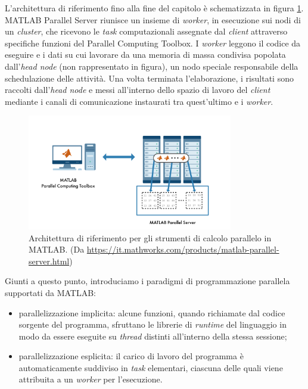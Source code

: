 L'architettura di riferimento fino alla fine del capitolo \`e schematizzata in figura \ref{fig:ArchitetturaRiferimento}.\newline
MATLAB Parallel Server riunisce un insieme di \textit{worker}, in esecuzione sui nodi di un \textit{cluster}, che ricevono le 
\textit{task} computazionali assegnate dal \textit{client} attraverso specifiche funzioni del Parallel Computing Toolbox. \newline
I \textit{worker} leggono il codice da eseguire e i dati su cui lavorare da una memoria di massa condivisa popolata dall'\textit{head node} 
(non rappresentato in figura), un nodo speciale responsabile della schedulazione delle attivit\`a.\newline
Una volta terminata l'elaborazione, i risultati sono raccolti dall'\textit{head node} e messi all'interno dello spazio di lavoro del \textit{client} 
mediante i canali di comunicazione instaurati tra quest'ultimo e i \textit{worker}.

\begin{figure}[htbp]
    \centering
    \includegraphics[width=0.8\textwidth]{../Immagini/Capitolo 2/ReferenceArchitecture.png}
    \caption{Architettura di riferimento per gli strumenti di calcolo parallelo in MATLAB. 
    \small{(Da \url{https://it.mathworks.com/products/matlab-parallel-server.html})}}
    \label{fig:ArchitetturaRiferimento}
\end{figure}

Giunti a questo punto, introduciamo i paradigmi di programmazione parallela supportati da MATLAB:
\begin{itemize}
    \item parallelizzazione implicita: alcune funzioni, quando richiamate dal codice sorgente del programma, sfruttano le librerie di \textit{runtime} del linguaggio 
    in modo da essere eseguite su \textit{thread} distinti all'interno della stessa sessione;
    \item parallelizzazione esplicita: il carico di lavoro del programma \`e automaticamente suddiviso in \textit{task} elementari, ciascuna delle quali viene 
    attribuita a un \textit{worker} per l'esecuzione.
\end{itemize}

